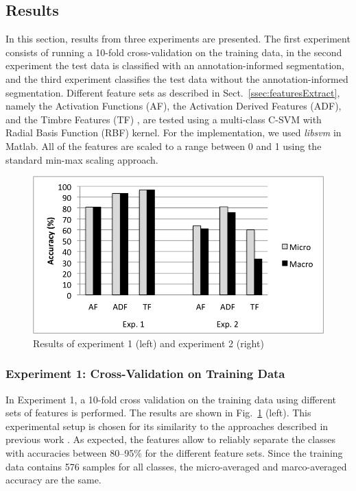 \documentclass{article}
\begin{document}
\subsection{Results}\label{ssec:results}
In this section, results from three experiments are presented. The first experiment consists of running a 10-fold cross-validation on the training data, in the second experiment the test data is classified with an annotation-informed segmentation, and the third experiment classifies the test data without the annotation-informed segmentation. Different feature sets as described in Sect.~\ref{ssec:featuresExtract}, namely the Activation Functions (AF), the Activation Derived Features (ADF), and the Timbre Features (TF) {\color{red}{(why don't you introduce the abbreviations when you introduce the features?)}}, are tested using a multi-class C-SVM with Radial Basis Function (RBF) kernel. For the implementation, we used \textit{libsvm}\cite{Chang2011} in Matlab.  All of the features are scaled to a range between 0 and 1 using the standard min-max scaling approach. {\color{red}{Earlier in this paragraph, I can also see a discussion or more detailed info, WHY Exp 1 and 2 make sense and why these 3 are chosen...}}

\begin{figure}
\centering
\includegraphics[width = 8.0 cm]{./figures/exp1_exp2.png}
\caption{Results of experiment 1 (left) and experiment 2 (right)}
\label{fig:exp1n2}
\end{figure}

\subsubsection{Experiment 1: Cross-Validation on Training Data}\label{sssec:exp1}
In Experiment 1, a 10-fold cross validation on the training data using different sets of features is performed. The results are shown in Fig.~\ref{fig:exp1n2} (left). This experimental setup is chosen for its similarity to the approaches described in previous work \cite{Tindale2004, Prockup2013}. As expected, the features allow to reliably separate the classes with accuracies between 80--95\% {\color{red}{CHECK!}} for the different feature sets. Since the training data contains 576 samples for all classes, the micro-averaged and marco-averaged accuracy are the same. {\color{red}{explanation: in the result section, we have to describe the results.}}
\end{document}
